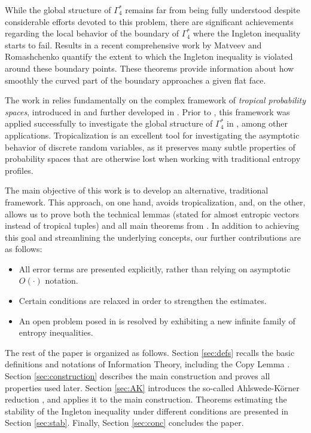 \documentclass[a4paper]{IEEEtran}
\def\Ga#1{\Gamma^*_{\!#1}}
\theoremstyle{definition}
\begin{document}
While the global structure of $\Ga4$ remains far from being fully understood 
despite considerable efforts devoted to this problem, there are significant 
achievements regarding the local behavior of the boundary of $\Ga4$ where the 
Ingleton inequality starts to fail. Results in a recent comprehensive work by 
Matveev and Romashchenko \cite{rom3} quantify the extent to which the Ingleton 
inequality is violated around these boundary points. These theorems provide 
information about how smoothly the curved part of the boundary approaches a 
given flat face. 

The work in \cite{rom3} relies fundamentally on the complex framework of
\emph{tropical probability spaces}, introduced in \cite{MP18} and further
developed in \cite{MP20a}. Prior to \cite{rom3}, this framework was applied
successfully to investigate the global structure of $\Ga4$ in \cite{MP20},
among other applications. Tropicalization is an excellent tool for investigating the
asymptotic behavior of discrete random variables, as it preserves many
subtle properties of probability spaces that are otherwise lost when working
with traditional entropy profiles.

The main objective of this work is to develop an alternative, traditional
framework. This approach, on one hand, avoids tropicalization, and, on the 
other, allows us to prove both the technical lemmas (stated for almost 
entropic vectors instead of tropical tuples) and all main theorems from \cite{rom3}. 
In addition to achieving this goal and streamlining the underlying concepts, 
our further contributions are as follows:
\begin{itemize}
\item All error terms are presented explicitly, rather than relying on asymptotic
 $O(\boldsymbol\cdot)$ notation.
\item Certain conditions are relaxed in order to strengthen the estimates.
\item An open problem posed in \cite{rom3} is resolved by exhibiting a new
infinite family of entropy inequalities.
\end{itemize}

The rest of the paper is organized as follows. Section \ref{sec:defs}
recalls the basic definitions and notations of Information Theory, including
the Copy Lemma \cite{DFZ11}. Section \ref{sec:construction} describes the
main construction and proves all properties used later. Section \ref{sec:AK}
introduces the so-called Ahlswede-K\"orner reduction \cite{AK, MMRV,
M.fmadhe}, and applies it to the main construction. Theorems estimating the
stability of the Ingleton inequality under different conditions are
presented in Section \ref{sec:stab}. Finally, Section \ref{sec:conc} concludes
the paper.
\end{document}
